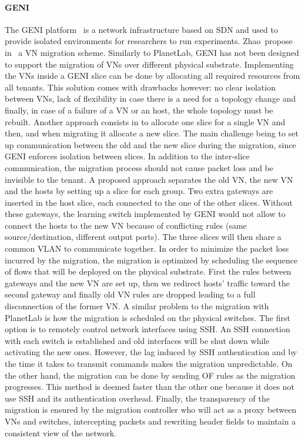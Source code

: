 \paragraph{GENI} The GENI platform~\cite{GENI-Berman2014} is a network infrastructure based on SDN and used to provide isolated environments for researchers to run experiments.
Zhao~\etal propose in~\cite{Zhao2017} a VN migration scheme. Similarly to PlanetLab, GENI has not been designed to support the migration of VNs over different physical substrate. Implementing the VNs inside a GENI slice can be done by allocating all required resources from all tenants. This solution comes with drawbacks however: no clear isolation between VNs, lack of flexibility in case there is a need for a topology change and finally, in case of a failure of a VN or an host, the whole topology must be rebuilt.
Another approach consists in to allocate one slice for a single VN and then, and when migrating it allocate a new slice. The main challenge being to set up communication between the old and the new slice during the migration, since GENI enforces isolation between slices.
In addition to the inter-slice communication, the migration process should not cause packet loss and be invisible to the tenant.
A proposed approach separates the old VN, the new VN and the hosts by setting up a slice for each group. Two extra gateways are inserted in the host slice, each connected to the one of the other slices.
Without these gateways, the learning switch implemented by GENI would not allow to connect the hosts to the new VN because of conflicting rules (same source/destination, different output ports).
The three slices will then share a common VLAN to communicate together.
In order to minimize the packet loss incurred by the migration, the migration is optimized by scheduling the sequence of flows that will be deployed on the physical substrate.
First the rules between gateways and the new VN are set up, then we redirect hosts' traffic toward the second gateway and finally old VN rules are dropped leading to a full disconnection of the former VN.
A similar problem to the migration with PlanetLab is how the migration is scheduled on the physical switches.
The first option is to remotely control network interfaces using SSH.
An SSH connection with each switch is established and old interfaces will be shut down while activating the new ones.
However, the lag induced by SSH authentication and by the time it takes to transmit commands makes the migration unpredictable.
On the other hand, the migration can be done by sending OF rules as the migration progresses. This method is deemed faster than the other one because it does not use SSH and its authentication overhead.
Finally, the transparency of the migration is ensured by the migration controller who will act as a proxy between VNs and switches, intercepting packets and rewriting header fields to maintain a consistent view of the network.

